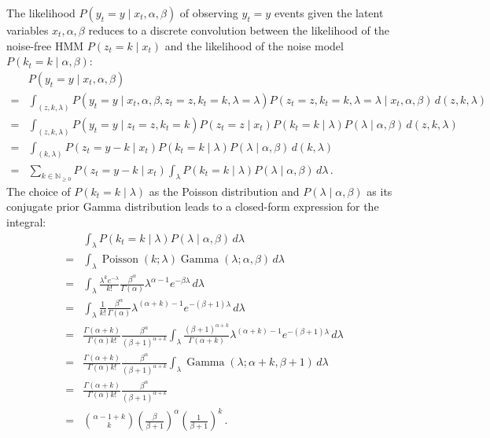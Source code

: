 \documentclass[twoside, 11pt]{article}
\DeclareMathOperator*{\gammad}{Gamma}
\DeclareMathOperator*{\poissond}{Poisson}
\newcommand{\nonnegint}[0] {\mathbb{N}_{\geq 0}}
\begin{document}
The likelihood $P(y_t=y \mid x_t, \alpha, \beta)$ of observing $y_t=y$ events given the latent variables $x_t, \alpha, \beta$ reduces to a discrete convolution between the likelihood of the noise-free HMM $P(z_t=k \mid x_t)$ and the likelihood of the noise model $P(k_t=k \mid \alpha, \beta)$:
\begin{align}
& P(y_t=y \mid x_t, \alpha, \beta) \nonumber \\
= & \int_{(z, k, \lambda)} P(y_t=y \mid x_t, \alpha, \beta, z_t=z, k_t=k, \lambda=\lambda) P(z_t=z, k_t=k, \lambda=\lambda \mid x_t, \alpha, \beta) \, d(z, k, \lambda) \nonumber \\
= & \int_{(z, k, \lambda)}
P(y_t=y \mid z_t=z, k_t=k)
P(z_t=z \mid x_t)
P(k_t=k \mid \lambda)
P(\lambda \mid \alpha, \beta)
\, d(z, k, \lambda) \nonumber \\
= & \int_{(k, \lambda)}
P(z_t=y-k \mid x_t)
P(k_t=k \mid \lambda)
P(\lambda \mid \alpha, \beta)
\, d(k, \lambda) \nonumber \\
= & \sum_{k \in \nonnegint} P(z_t = y-k \mid x_t)
\int_{\lambda} P(k_t = k \mid \lambda) P(\lambda \mid \alpha, \beta) \, d \lambda \, .
\end{align}
The choice of $P(k_t = k \mid \lambda)$ as the Poisson distribution and $P(\lambda \mid \alpha, \beta)$ as its conjugate prior Gamma distribution leads to a closed-form expression for the integral:
\begin{align}
& \int_{\lambda}
P(k_t = k \mid \lambda) P(\lambda \mid \alpha, \beta)
\, d \lambda \nonumber \\
= & \int_{\lambda}
\poissond( k ; \lambda) \gammad( \lambda ; \alpha, \beta)
\, d \lambda \nonumber \\
= & \int_{\lambda}
\frac{\lambda^k e^{-\lambda}}{k!}
\frac{\beta^{\alpha}}{\Gamma(\alpha)}
\lambda^{\alpha-1} e^{-\beta \lambda}
\, d \lambda \nonumber \\
= & \int_{\lambda}
\frac{1}{k!}
\frac{\beta^{\alpha}}{\Gamma(\alpha)}
\lambda^{(\alpha+k)-1} e^{-(\beta+1) \lambda}
\, d \lambda \nonumber \\
= &
\frac{\Gamma(\alpha+k)}{\Gamma(\alpha) k!}
\frac{\beta^{\alpha}}{(\beta+1)^{\alpha+k}}
\int_{\lambda}
\frac{(\beta+1)^{\alpha+k}}{\Gamma(\alpha+k)}
\lambda^{(\alpha+k)-1} e^{-(\beta+1) \lambda}
\, d \lambda \nonumber \\
= &
\frac{\Gamma(\alpha+k)}{\Gamma(\alpha) k!}
\frac{\beta^{\alpha}}{(\beta+1)^{\alpha+k}}
\int_{\lambda}
\gammad(\lambda ; \alpha+k, \beta+1)
\, d \lambda \nonumber \\
= &
\frac{\Gamma(\alpha+k)}{\Gamma(\alpha) k!}
\frac{\beta^{\alpha}}{(\beta+1)^{\alpha+k}}
\nonumber \\
= &
\binom{\alpha-1+k}{k} \left( \frac{\beta}{\beta+1} \right)^{\alpha} \left( \frac{1}{\beta+1} \right)^{k} \, .
\end{align}
\end{document}
